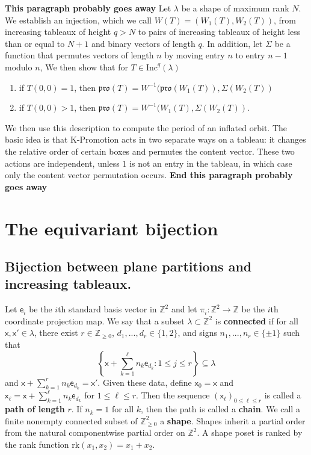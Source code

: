 \documentclass[12pt]{amsart}
\newcommand{\x}{\ensuremath{\mathsf{x}}}
\newcommand{\e}{\ensuremath{\mathsf{e}}}
\theoremstyle{definition}
\theoremstyle{remark}
\numberwithin{equation}{section}
\newcommand{\inc}{\ensuremath{\mathrm{Inc}}}
\newcommand{\pro}{\mathfrak{pro}}
\begin{document}
\textbf{This paragraph probably goes away}
Let $\lambda$ be a shape of maximum rank $N$. We establish an injection, which we call $W(T) = (W_1(T),W_2(T))$, from increasing tableaux of height $q > N$ to pairs of increasing tableaux of height less than or equal to $N+1$ and binary vectors of length $q$. In addition, let $\Sigma$ be a function that permutes vectors of length $n$ by moving entry $n$ to entry $n-1$ modulo $n$, We then show that for $T \in \inc^q(\lambda)$
\begin{enumerate}
\item if $T(0,0) =1$, then $\pro(T) = W^{-1}(\pro(W_1(T)),\Sigma(W_2(T))$
\item if $T(0,0) > 1$, then $\pro(T) = W^{-1}(W_1(T),\Sigma(W_2(T))$.
\end{enumerate} 
We then use this description to compute the period of an inflated orbit. The basic idea is that K-Promotion acts in two separate ways on a tableau: it changes the relative order of certain boxes and permutes the content vector. These two actions are independent, unless $1$ is not an entry in the tableau, in which case only the content vector permutation occurs. 
\textbf{End this paragraph probably goes away}
\\

\section{The equivariant bijection}\label{sec:equivariant}
\subsection{Bijection between plane partitions and increasing tableaux.} 

Let $\e_i$ be the $i$th standard basis vector in $\mathbb{Z}^{2}$ and let $\pi_i : \mathbb{Z}^{2} \to \mathbb{Z}$ be the $i$th coordinate projection map. We say that a subset $\lambda \subset \mathbb{Z}^{2}$ is {\bf connected} if for all $\x,\x' \in \lambda$, there exist $r \in \mathbb{Z}_{\geq 0}$, $d_1,...,d_r \in \{1, 2 \}$, and signs $n_1,...,n_r \in \{ \pm 1 \}$ such that 
\[\left\{ \x + \sum_{k=1}^\ell n_k \e_{d_k} :  1\leq j \leq r \right\} \subseteq \lambda\]
 and $\x + \sum_{k=1}^r n_k \e_{d_k} = \x'$. Given these data, define $\x_0 = \x$ and $\x_\ell = \x + \sum_{k=1}^\ell n_k \e_{d_k}$ for $1 \leq \ell \leq r$. Then the sequence $\left( \x_\ell  \right)_{0 \leq \ell \leq r}$ is called a {\bf path of length} $r$. If $n_k = 1$ for all $k$, then the path is called a {\bf chain}. We call a finite nonempty connected subset of $\mathbb{Z}_{\geq 0}^2$ a {\bf shape}.  Shapes inherit a partial order from the natural componentwise partial order on $\mathbb{Z}^2$. A shape poset is ranked by the rank function $\text{rk}(x_1,x_2) = x_1 + x_2$.
\end{document}
